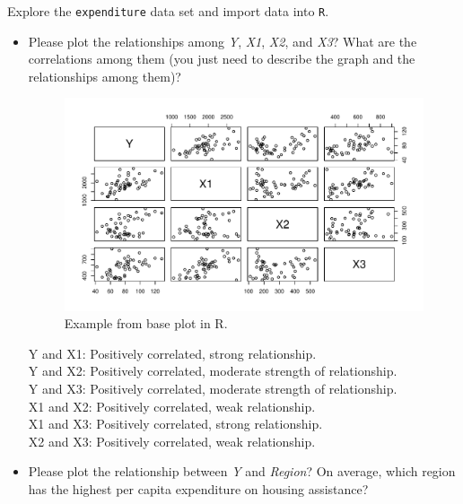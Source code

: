 \documentclass[12pt,letterpaper]{article}
\begin{document}
\vspace{.5cm}
\noindent Explore the \texttt{expenditure} data set and import data into \texttt{R}.
\vspace{.5cm}
\vspace{.5cm}
\begin{itemize}

\item
Please plot the relationships among \emph{Y}, \emph{X1}, \emph{X2}, and \emph{X3}? What are the correlations among them (you just need to describe the graph and the relationships among them)?
  
\begin{figure}[h!]\centering
	\caption{\footnotesize Example from base plot in R.}
	\label{fig:plot_1}
	\includegraphics[width=.85\textwidth]{expenditure_plot.pdf}
\end{figure}
\noindent Y and X1: Positively correlated, strong relationship.\\
\noindent Y and X2: Positively correlated, moderate strength of relationship.\\
\noindent Y and X3: Positively correlated, moderate strength of relationship.\\
\noindent X1 and X2: Positively correlated, weak relationship.\\
\noindent X1 and X3: Positively correlated, strong relationship.\\
\noindent X2 and X3: Positively correlated, weak relationship.\\
\vspace{.5cm}
\vspace{.5cm}
\item
Please plot the relationship between \emph{Y} and \emph{Region}? On average, which region has the highest per capita expenditure on housing assistance?
\vspace{.5cm}

\end{itemize}
\end{document}
